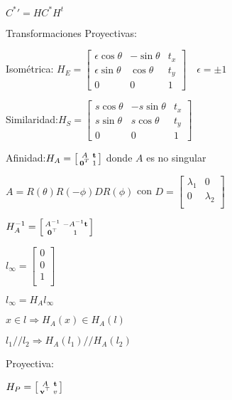 \documentclass[12pt,a4paper]{article}
\begin{document}
${C^{*}}'= H C^{*} H^{t}$

Transformaciones Proyectivas:

Isom\'etrica: $
H_{E} =
\left[ {\begin{smallmatrix}
 \epsilon \cos \theta & -\sin \theta& t_{x} \\
 \epsilon \sin \theta & \cos \theta& t_{y} \\
 0 & 0 & 1
\end{smallmatrix} } \right]
\quad \epsilon = \pm 1$

Similaridad:$
H_{S} =
\left[ {\begin{smallmatrix}
 s \cos \theta & - s \sin \theta& t_{x} \\
 s \sin \theta & s\cos \theta& t_{y} \\
 0 & 0 & 1
\end{smallmatrix} } \right]
$

Afinidad:$
H_{A} =
\left[ {\begin{smallmatrix}
 A & {\bf t}\\
 {\bf 0}^{T} & 1 \\
\end{smallmatrix} } \right]
$ donde $A$ es no singular

$A = R(\theta)R(-\phi)DR(\phi)$ con $D = \left[ {\begin{smallmatrix}
 \lambda_{1} & 0\\
 0 & \lambda_{2}\\
\end{smallmatrix} } \right]$

$
H_{A}^{-1} =
\left[ {\begin{smallmatrix}
 A^{-1} & -A^{-1}{\bf t}\\
 {\bf 0}^{\top} & 1 \\
\end{smallmatrix} } \right]
$

$l_{\infty} = \left[ {\begin{smallmatrix}
 0\\
 0\\
 1\\
\end{smallmatrix} } \right]$

$l_{\infty} = H_{A} l_{\infty}$

$x \in l \Rightarrow H_{A}(x) \in H_{A}(l)$

$l_{1} // l_{2} \Rightarrow H_{A}(l_{1})//H_{A}(l_{2})$

Proyectiva:

$H_{P} =
\left[ {\begin{smallmatrix}
 A & {\bf t}\\
 {\bf v}^{\top} & v \\
\end{smallmatrix} } \right]
$
\end{document}
